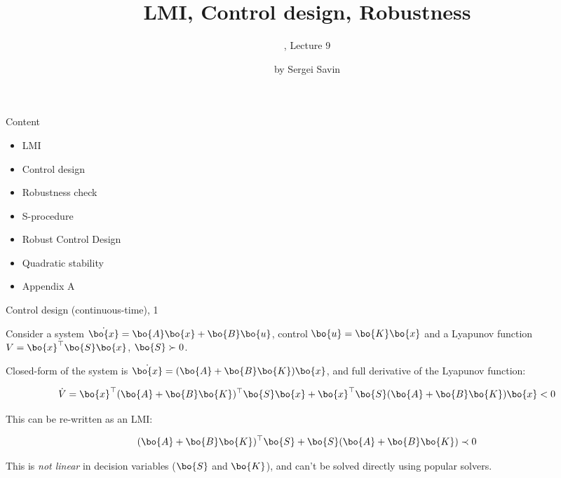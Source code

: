 \documentclass{beamer}
\title{LMI, Control design, Robustness}
\subtitle{\mycoursetitle, Lecture 9}
\author{by Sergei Savin}
\date{\mydate}
\begin{document}
\maketitle


\begin{frame}{Content}
	
	\begin{itemize}
		\item LMI
		\item Control design
		\item Robustness check
		\item S-procedure
		\item Robust Control Design
		\item Quadratic stability
		\item Appendix A
	\end{itemize}
	
	
\end{frame}





\begin{frame}{Control design (continuous-time), 1}
	\begin{flushleft}
		
		Consider a system $\dot{\bo{x}} = \bo{A}\bo{x} + \bo{B}\bo{u}$, control $\bo{u} = \bo{K}\bo{x}$ and a Lyapunov function $V = \bo{x}^\top\bo{S}\bo{x}$, $\bo{S} \succ 0$.
		
		\bigskip
		
		Closed-form of the system is $\dot{\bo{x}} = (\bo{A} + \bo{B}\bo{K})\bo{x}$, and full derivative of the Lyapunov function:
		
		\begin{equation}
			\dot V = \bo{x}^\top (\bo{A} + \bo{B}\bo{K})^\top\bo{S}\bo{x} + \bo{x}^\top\bo{S} (\bo{A} + \bo{B}\bo{K}) \bo{x} < 0
		\end{equation}
		
		This can be re-written as an LMI:
		
		\begin{equation}
			\label{eq:vdot}
			(\bo{A} + \bo{B}\bo{K})^\top\bo{S} + \bo{S} (\bo{A} + \bo{B}\bo{K}) \prec 0
		\end{equation}
		
		This is \emph{not linear} in decision variables ($\bo{S}$ and $\bo{K}$), and can't be solved directly using popular solvers.
		
	\end{flushleft}
\end{frame}
\end{document}
